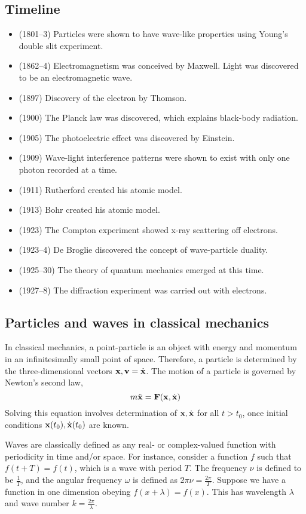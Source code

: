 \subsection{Timeline}
\begin{itemize}
	\item (1801--3) Particles were shown to have wave-like properties using Young's double slit experiment.
	\item (1862--4) Electromagnetism was conceived by Maxwell.
	      Light was discovered to be an electromagnetic wave.
	\item (1897) Discovery of the electron by Thomson.
	\item (1900) The Planck law was discovered, which explains black-body radiation.
	\item (1905) The photoelectric effect was discovered by Einstein.
	\item (1909) Wave-light interference patterns were shown to exist with only one photon recorded at a time.
	\item (1911) Rutherford created his atomic model.
	\item (1913) Bohr created his atomic model.
	\item (1923) The Compton experiment showed x-ray scattering off electrons.
	\item (1923--4) De Broglie discovered the concept of wave-particle duality.
	\item (1925--30) The theory of quantum mechanics emerged at this time.
	\item (1927--8) The diffraction experiment was carried out with electrons.
\end{itemize}

\subsection{Particles and waves in classical mechanics}
In classical mechanics, a point-particle is an object with energy and momentum in an infinitesimally small point of space.
Therefore, a particle is determined by the three-dimensional vectors \( \vb x, \vb v = \dot{\vb x} \).
The motion of a particle is governed by Newton's second law,
\[
	m \ddot{\vb x} = \vb F(\vb x, \dot{\vb x})
\]
Solving this equation involves determination of \( \vb x, \dot{\vb x} \) for all \( t > t_0 \), once initial conditions \( \vb x(t_0), \dot{\vb x}(t_0) \) are known.

Waves are classically defined as any real- or complex-valued function with periodicity in time and/or space.
For instance, consider a function \( f \) such that \( f(t + T) = f(t) \), which is a wave with period \( T \).
The frequency \( \nu \) is defined to be \( \frac{1}{T} \), and the angular frequency \( \omega \) is defined as \( 2 \pi \nu = \frac{2\pi}{T} \).
Suppose we have a function in one dimension obeying \( f(x+\lambda) = f(x) \).
This has wavelength \( \lambda \) and wave number \( k = \frac{2\pi}{\lambda} \).

